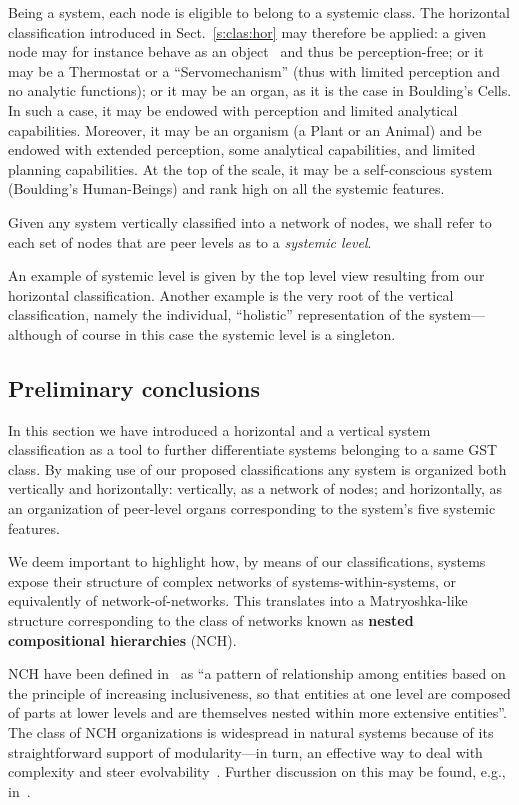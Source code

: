 \documentclass[twocolumn]{svjour3}
\begin{document}
Being a system, 
each node is eligible to belong to a systemic class. The horizontal classification
introduced in Sect.~\ref{s:clas:hor} may therefore be applied:
a given node may for instance
behave as an object~\cite{RWB43} and thus be perception-free; or it may be a Thermostat or
a ``Servomechanism'' (thus with limited perception and no analytic functions); or it
may be an organ, as it is the case in Boulding's Cells. In such a case, it
may be endowed with perception and limited analytical capabilities. Moreover,
it may be an organism (a Plant or an Animal) and be endowed with extended perception,
some analytical capabilities, and limited planning capabilities. At the top of the scale,
it may be a self-conscious system (Boulding's Human-Beings) and rank high on all
the systemic features.

\begin{definition}
Given any system vertically classified into a network of nodes, we shall refer to each set of nodes
that are peer levels as to a \emph{systemic level}.
\end{definition}
An example of systemic level is given by the top level view resulting from our
horizontal classification. Another example is
	the very root of the vertical classification, namely the individual, ``holistic''
representation of the system---although of course in this case the systemic level is a singleton.

\subsection{Preliminary conclusions}
In this section we have introduced a horizontal and a vertical system classification as a tool to further
differentiate systems belonging to a same GST class.
By making use of our proposed classifications any system 
is organized both vertically and horizontally: vertically, as a network of nodes; and horizontally,
as an organization of peer-level organs corresponding to the system's five systemic features.

We deem important to highlight how, by means of our classifications,
systems expose their structure of complex networks of systems-within-systems,
or equivalently of network-of-networks. This translates into 
a Matryoshka-like structure corresponding to the class of networks
known as \textbf{nested compositional hierarchies} (NCH).

NCH have been defined in~\cite{HT:TE14a} as ``a pattern of relationship among entities based on the
principle of increasing inclusiveness, so that entities at one level are composed of parts
at lower levels and are themselves nested within more extensive entities''.
The class of NCH organizations
is widespread in natural systems because of its straightforward support of modularity---in
turn, an effective way to deal with complexity and steer evolvability~\cite{WaAl1996}.
Further discussion on this may be found, e.g., in~\cite{DF15c}.
\end{document}
